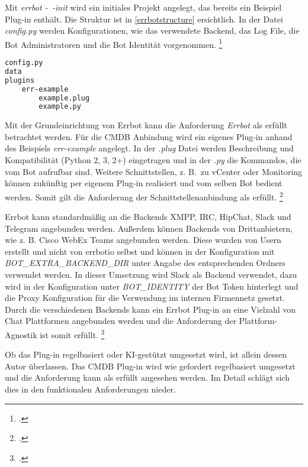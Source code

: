 Mit \textit{errbot -~-init} wird ein initiales Projekt angelegt, das bereits ein Beispiel Plug-in enthält. Die Struktur ist in \autoref{errbotstructure} ersichtlich. In der Datei \textit{config.py} werden Konfigurationen, wie das verwendete Backend, das Log File, die Bot Administratoren und die Bot Identität vorgenommen.
\footcite[Vgl.][o. \pno]{errbot_2018_setup}

\begin{lstlisting}[language=bash, label=errbotstructure, caption=Struktur eines Errbot Projektes]
config.py
data
plugins
    err-example
        example.plug
        example.py
\end{lstlisting}

Mit der Grundeinrichtung von Errbot kann die Anforderung \textit{Errbot} als erfüllt betrachtet werden. Für die \acs{CMDB} Anbindung wird ein eigenes Plug-in anhand des Beispiels \textit{err-example} angelegt. In der \textit{.plug} Datei werden Beschreibung und Kompatibilität (Python 2, 3, 2+) eingetragen und in der \textit{.py} die Kommandos, die vom Bot aufrufbar sind. Weitere Schnittstellen, z. B.~zu vCenter oder Monitoring können zukünftig per eigenem Plug-in realisiert und vom selben Bot bedient werden. Somit gilt die Anforderung der Schnittstellenanbindung als erfüllt. 
\footcite[Vgl.][o. \pno]{errbot_2018_plugin}


Errbot kann standardmäßig an die Backends XMPP, IRC, HipChat, Slack und Telegram angebunden werden. Außerdem können Backends von Drittanbietern, wie z. B. Cisco WebEx Teams angebunden werden. Diese wurden von Usern erstellt und nicht von errbotio selbst und können in der Konfiguration mit \textit{BOT\_EXTRA\_BACKEND\_DIR} unter Angabe des entsprechenden Ordners verwendet werden. In dieser Umsetzung wird Slack als Backend verwendet, dazu wird in der Konfiguration unter \textit{BOT\_IDENTITY} der Bot Token hinterlegt und die Proxy Konfiguration für die Verwendung im internen Firmennetz gesetzt. Durch die verschiedenen Backends kann ein Errbot Plug-in an eine Vielzahl von Chat Plattformen angebunden werden und die Anforderung der Plattform-Agnostik ist somit erfüllt.
\footcites[Vgl.][o. \pno]{errbot_2018_setup}[Vgl.][o. \pno]{errbot_2018_webex}

Ob das Plug-in regelbasiert oder KI-gestützt umgesetzt wird, ist allein dessen Autor überlassen. Das \acs{CMDB} Plug-in wird wie gefordert regelbasiert umgesetzt und die Anforderung kann als erfüllt angesehen werden. Im Detail schlägt sich dies in den funktionalen Anforderungen nieder.


